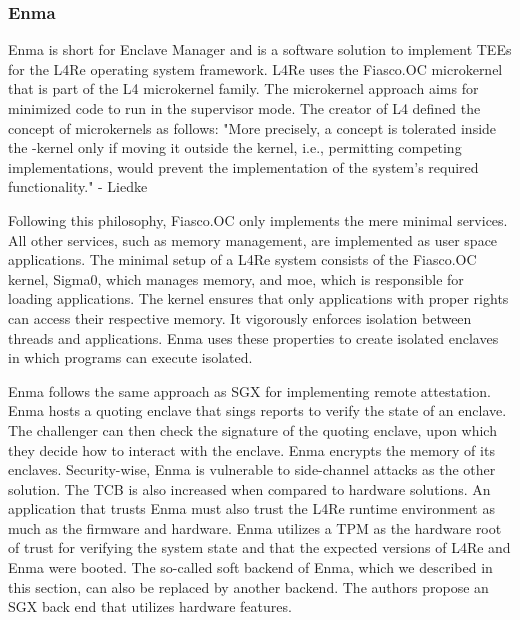\subsubsection{Enma}
Enma is short for Enclave Manager and is a software solution to implement TEEs for the L4Re operating system framework.
\cite{reitz_isolierende_2019}
L4Re uses the Fiasco.OC microkernel that is part of the L4 microkernel family. The microkernel approach aims for
minimized code to run in the supervisor mode. The creator of L4 defined the concept of microkernels as follows:
"More precisely, a concept is tolerated inside the \mu-kernel only if moving it outside the kernel, i.e., permitting
competing implementations, would prevent the implementation of the system's required functionality."
- Liedke\cite{liedtke1995micro}

Following this philosophy, Fiasco.OC only implements the mere minimal services. All other services, such as memory
management, are implemented as user space applications. The minimal setup of a L4Re system consists of the Fiasco.OC
kernel, Sigma0, which manages memory, and moe, which is responsible for loading applications. The kernel ensures that only
applications with proper rights can access their respective memory. It vigorously enforces isolation between threads and
applications. Enma uses these properties to create isolated enclaves in which programs can execute isolated.

Enma follows the same approach as SGX for implementing remote attestation. Enma
hosts a quoting enclave that sings reports to verify the state of an enclave. The challenger can then check the
signature of the quoting enclave, upon which they decide how to interact with the enclave. Enma encrypts the memory of
its enclaves. Security-wise, Enma is vulnerable to side-channel attacks as the other solution. The TCB is also increased
when compared to hardware solutions. An application that trusts Enma must also trust the L4Re runtime environment as
much as the firmware and hardware. Enma utilizes a TPM as the hardware root of trust for verifying the system state and
that the expected versions of L4Re and Enma were booted. The so-called soft backend of Enma, which we described in this
section, can also be replaced by another backend. The authors propose an SGX back end that utilizes hardware features.


